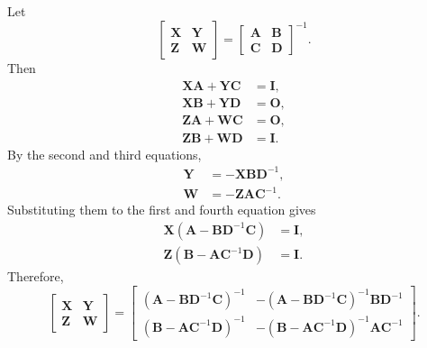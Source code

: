 \subsection{}
\label{2.24}
Let
%
\[
\begin{bmatrix}
\mathbf{X} & \mathbf{Y} \\
\mathbf{Z} & \mathbf{W}
\end{bmatrix}
=
\begin{bmatrix}
\mathbf{A} & \mathbf{B} \\
\mathbf{C} & \mathbf{D}
\end{bmatrix}
^ {-1}.
\]
%
Then
%
\begin{equation}
\begin{aligned}
\mathbf{X} \mathbf{A} 
+ 
\mathbf{Y} \mathbf{C} 
&= 
\mathbf{I}, 
\\
\mathbf{X} \mathbf{B} 
+ 
\mathbf{Y} \mathbf{D} 
&= 
\mathbf{O}, 
\\
\mathbf{Z} \mathbf{A} 
+ 
\mathbf{W} \mathbf{C} 
&= 
\mathbf{O}, 
\\
\mathbf{Z} \mathbf{B} 
+ 
\mathbf{W} \mathbf{D} 
&= 
\mathbf{I}.
\end{aligned}
\end{equation}
%
By the second and third equations,
%
\begin{equation}
\begin{aligned}
\mathbf{Y} 
&= 
- 
\mathbf{X} \mathbf{B} \mathbf{D} ^ {- 1}, \\
\mathbf{W} 
&= 
- 
\mathbf{Z} \mathbf{A} \mathbf{C} ^ {- 1}.
\end{aligned}
\end{equation}
%
Substituting them to the first and fourth equation gives
%
\begin{equation}
\begin{aligned}
\mathbf{X} 
\left( 
	\mathbf{A} 
	- 
	\mathbf{B} \mathbf{D} ^ {- 1} \mathbf{C} 
\right)
&= 
\mathbf{I}, 
\\
\mathbf{Z} 
\left( 
	\mathbf{B} 
	- 
	\mathbf{A} \mathbf{C} ^ {- 1} \mathbf{D} 
\right)
&= 
\mathbf{I}.
\end{aligned}
\end{equation}
%
Therefore,
%
\[
\begin{bmatrix}
\mathbf{X} & \mathbf{Y} \\
\mathbf{Z} & \mathbf{W}
\end{bmatrix}
=
\begin{bmatrix}
\left( 
	\mathbf{A} 
	- 
	\mathbf{B} \mathbf{D} ^ {- 1} \mathbf{C} 
\right) ^ {- 1} 
& 
- 
\left( 
	\mathbf{A} 
	- 
	\mathbf{B} \mathbf{D} ^ {- 1} \mathbf{C} 
\right) ^ {- 1} 
\mathbf{B} \mathbf{D} ^ {- 1} 
\\
\left( 
	\mathbf{B} 
	- 
	\mathbf{A} \mathbf{C} ^ {- 1} \mathbf{D} 
\right) ^ {- 1} 
& 
- 
\left( 
	\mathbf{B} 
	- 
	\mathbf{A} \mathbf{C} ^ {- 1} \mathbf{D} 
\right) ^ {- 1} 
\mathbf{A} 
\mathbf{C} ^ {- 1}
\end{bmatrix}
.
\]
%


